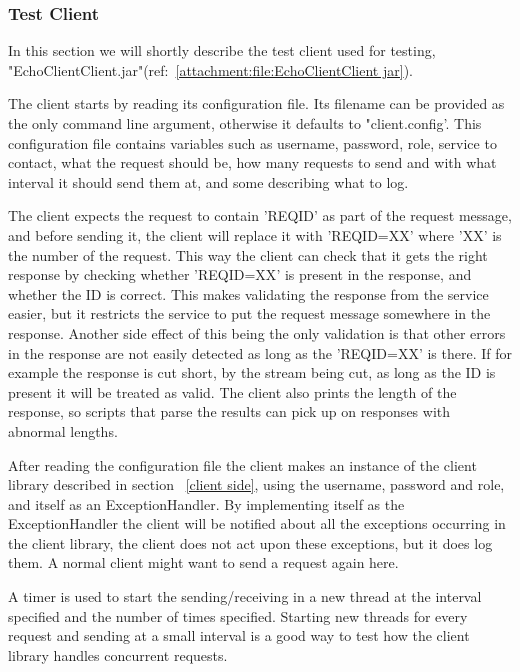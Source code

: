\subsubsection{Test Client}\label{Testing:About:Client}
    In this section we will shortly describe the test client used for testing, "EchoClientClient.jar"(ref:~\ref{attachment:file:EchoClientClient jar}).

    The client starts by reading its configuration file. Its filename can be provided as the only command line argument, otherwise it defaults to "client.config'. This configuration file contains variables such as username, password, role, service to contact, what the request should be, how many requests to send and with what interval it should send them at, and some describing what to log.

    The client expects the request to contain '{REQID}' as part of the request message, and before sending it, the client will replace it with '{REQID=XX}' where 'XX' is the number of the request. This way the client can check that it gets the right response by checking whether '{REQID=XX}' is present in the response, and whether the ID is correct. This makes validating the response from the service easier, but it restricts the service to put the request message somewhere in the response. Another side effect of this being the only validation is that other errors in the response are not easily detected as long as the '{REQID=XX}' is there. If for example the response is cut short, by the stream being cut, as long as the ID is present it will be treated as valid. The client also prints the length of the response, so scripts that parse the results can pick up on responses with abnormal lengths.

    After reading the configuration file the client makes an instance of the client library described in section ~\ref{client side}, using the username, password and role, and itself as an ExceptionHandler. By implementing itself as the ExceptionHandler the client will be notified about all the exceptions occurring in the client library, the client does not act upon these exceptions, but it does log them. A normal client might want to send a request again here.
    
    A timer is used to start the sending/receiving in a new thread at the interval specified and the number of times specified. Starting new threads for every request and sending at a small interval is a good way to test how the client library handles concurrent requests.

